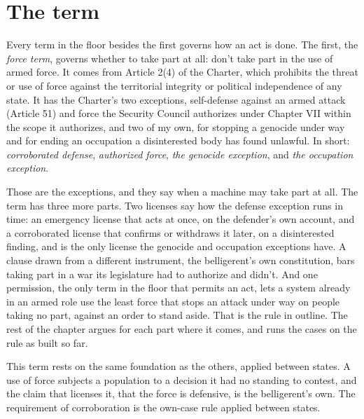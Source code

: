 \section{The term}
\label{sec:6.1}
Every term in the floor besides the first governs how an act is done. The first, the \emph{force term}, governs whether to take part at all: don't take part in the use of armed force. It comes from Article 2(4) of the Charter, which prohibits the threat or use of force against the territorial integrity or political independence of any state. It has the Charter's two exceptions, self-defense against an armed attack (Article 51) and force the Security Council authorizes under Chapter VII within the scope it authorizes, and two of my own, for stopping a genocide under way and for ending an occupation a disinterested body has found unlawful. In short: \emph{corroborated defense}, \emph{authorized force}, \emph{the genocide exception}, and \emph{the occupation exception}.

Those are the exceptions, and they say when a machine may take part at all. The term has three more parts. Two licenses say how the defense exception runs in time: an emergency license that acts at once, on the defender's own account, and a corroborated license that confirms or withdraws it later, on a disinterested finding, and is the only license the genocide and occupation exceptions have. A clause drawn from a different instrument, the belligerent's own constitution, bars taking part in a war its legislature had to authorize and didn't. And one permission, the only term in the floor that permits an act, lets a system already in an armed role use the least force that stops an attack under way on people taking no part, against an order to stand aside. That is the rule in outline. The rest of the chapter argues for each part where it comes, and runs the cases on the rule as built so far.

This term rests on the same foundation as the others, applied between states. A use of force subjects a population to a decision it had no standing to contest, and the claim that licenses it, that the force is defensive, is the belligerent's own. The requirement of corroboration is the own-case rule applied between states.

